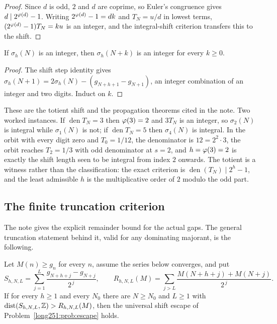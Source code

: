 \documentclass[11pt]{article}
\begin{document}
\begin{proof}
Since $d$ is odd, $2$ and $d$ are coprime, so Euler's congruence gives
$d\mid2^{\varphi(d)}-1$.  Writing $2^{\varphi(d)}-1=dk$ and $T_N=u/d$ in lowest terms,
$(2^{\varphi(d)}-1)T_N=ku$ is an integer, and the integral-shift criterion
transfers this to the shift.
\end{proof}

\begin{proposition}[propagation]\label{long251:xr:propagate}
If $\sigma_h(N)$ is an integer, then $\sigma_h(N+k)$ is an integer for every
$k\ge0$.
\end{proposition}

\begin{proof}
The shift step identity gives
$\sigma_h(N+1)=2\sigma_h(N)-(g_{N+h+1}-g_{N+1})$, an integer combination of an
integer and two digits.  Induct on $k$.
\end{proof}

\noindent These are the totient shift and the propagation theorems cited in the
note.  Two worked instances.  If $\operatorname{den}T_N=3$ then $\varphi(3)=2$ and
$3T_N$ is an integer, so $\sigma_2(N)$ is integral while $\sigma_1(N)$ is not;
if $\operatorname{den}T_N=5$ then $\sigma_4(N)$ is integral.  In the orbit with
every digit zero and $T_0=1/12$, the denominator is $12=2^2\cdot3$, the orbit
reaches $T_2=1/3$ with odd denominator at $s=2$, and $h=\varphi(3)=2$ is exactly the
shift length seen to be integral from index $2$ onwards.  The totient is a
witness rather than the classification: the exact criterion is
$\operatorname{den}(T_N)\mid2^{h}-1$, and the least admissible $h$ is the
multiplicative order of $2$ modulo the odd part.

\subsection{The finite truncation criterion}\label{long251:sec:xr-truncation}

The note gives the explicit remainder bound for the actual gaps.  The general
truncation statement behind it, valid for any dominating majorant, is the
following.

\begin{proposition}\label{long251:xr:truncation}
Let $M(n)\ge g_n$ for every $n$, assume the series below converges, and put
\[
 S_{h,N,L}=\sum_{j=1}^{L}\frac{g_{N+h+j}-g_{N+j}}{2^{\,j}},\qquad
 R_{h,N,L}(M)=\sum_{j>L}\frac{M(N+h+j)+M(N+j)}{2^{\,j}} .
\]
If for every $h\ge1$ and every $N_0$ there are $N\ge N_0$ and $L\ge1$ with
$\operatorname{dist}(S_{h,N,L},\mathbb{Z})>R_{h,N,L}(M)$, then the universal shift
escape of Problem~\ref{long251:prob:escape} holds.
\end{proposition}
\end{document}
